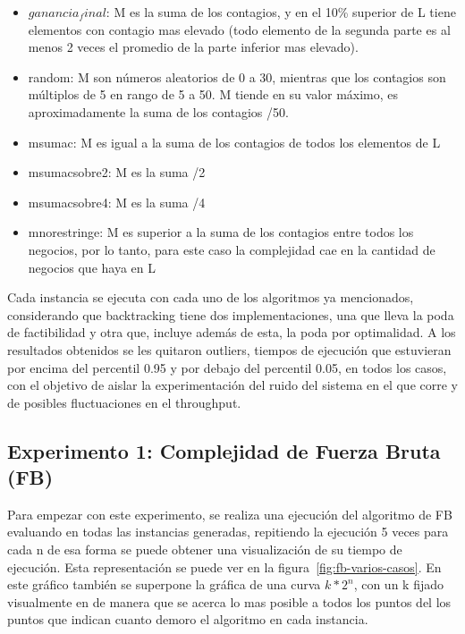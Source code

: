 \documentclass[10pt,a4paper]{article}
\begin{document}
\begin{itemize}
    \setlength{\itemsep}{1pt}
    \setlength{\parskip}{0pt}
    \setlength{\parsep}{0pt}
    \item $ganancia_final$: M es la suma de los contagios, y en el 10\% superior de L tiene elementos con contagio mas elevado (todo elemento de la segunda parte es al menos 2 veces el promedio de la parte inferior mas elevado).
    \item random: M son números aleatorios de 0 a 30, mientras que los contagios son múltiplos de 5 en rango de 5 a 50. M tiende en su valor máximo, es aproximadamente la suma de los contagios /50. 
    \item msumac: M es igual a la suma de los contagios de todos los elementos de L
    \item msumacsobre2: M es la suma /2
    \item msumacsobre4: M es la suma /4
    \item mnorestringe: M es superior a la suma de los contagios entre todos los negocios, por lo tanto, para este caso la complejidad cae en la cantidad de negocios que haya en L
\end{itemize}

Cada instancia se ejecuta con cada uno de los algoritmos ya mencionados, considerando que backtracking tiene dos implementaciones, una que lleva la poda de factibilidad y otra que, incluye además de esta, la poda por optimalidad. A los resultados obtenidos se les quitaron outliers, tiempos de ejecución que estuvieran por encima del percentil 0.95 y por debajo del percentil 0.05, en todos los casos, con el objetivo de aislar la experimentación del ruido del sistema en el que corre y de posibles fluctuaciones en el throughput.

\subsection{Experimento 1: Complejidad de Fuerza Bruta (FB)}

Para empezar con este experimento, se realiza una ejecución del algoritmo de FB evaluando en todas las instancias generadas, repitiendo la ejecución 5 veces para cada n de esa forma se puede obtener una visualización de su tiempo de ejecución. Esta representación se puede ver en la figura~\ref{fig:fb-varios-casos}. En este gráfico también se superpone la gráfica de una curva $k* 2^n$, con un k fijado visualmente en de manera que se acerca lo mas posible a todos los puntos del los puntos que indican cuanto demoro el algoritmo en cada instancia. 
\end{document}
